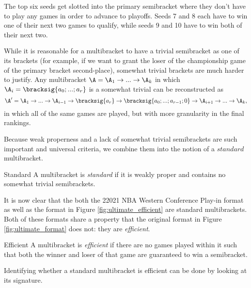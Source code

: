 {    

    The top six seeds get slotted into the primary semibracket where they don't have to play any games in order to advance to playoffs. Seeds 7 and 8 each have to win one of their next two games to qualify, while seeds 9 and 10 have to win both of their next two.

    While it is reasonable for a multibracket to have a trivial semibracket as one of its brackets (for example, if we want to grant the loser of the championship game of the primary bracket second-place), somewhat trivial brackets are much harder to justify. Any multibracket $\A = \A_1 \to ... \to \A_k$ in which $\A_i = \bracksig{a_0; ...; a_r}$ is a somewhat trivial can be reconstructed as $$\A' = \A_1 \to ... \to \A_{i-1} \to \bracksig{a_r} \to \bracksig{a_0; ...; a_{r-1}; 0} \to \A_{i+1} \to ... \to \A_k,$$ in which all of the same games are played, but with more granularity in the final rankings.

    Because weak properness and a lack of somewhat trivial semibrackets are such important and universal criteria, we combine them into the notion of a $\textit{standard}$ multibracket.

    \begin{definition}{Standard}{}
        A multibracket is \textit{standard} if it is weakly proper and contains no somewhat trivial semibrackets.
    \end{definition}

    It is now clear that the both the 22021 NBA Western Conference Play-in format as well as the format in Figure \ref{fig:ultimate_efficient} are standard multibrackets. Both of these formats share a property that the original format in Figure \ref{fig:ultimate_format} does not: they are \textit{efficient}.

    \begin{definition}{Efficient}{}
        A multibracket is \textit{efficient} if there are no games played within it such that both the winner and loser of that game are guaranteed to win a semibracket.
    \end{definition}

    Identifying whether a standard multibracket is efficient can be done by looking at its signature.


}
